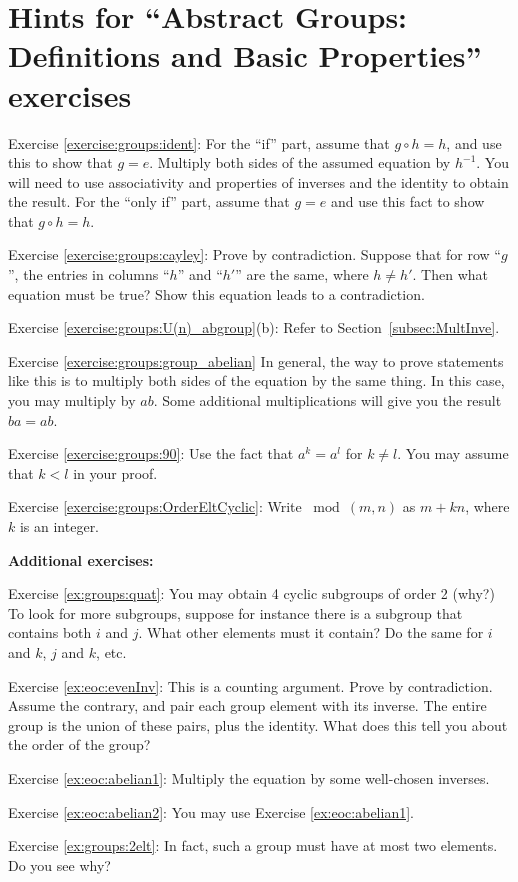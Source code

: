 \section{Hints for ``Abstract Groups: Definitions and Basic Properties'' exercises}
\label{sec:Groups:Hints}

\noindent Exercise \ref{exercise:groups:ident}: For the ``if'' part, assume that $g \circ h = h$, and use this to show that $g = e$. Multiply both sides of the assumed equation by $h^{-1}$. You will need to use associativity and properties of inverses and the identity to obtain the result.  For the ``only if'' part, assume that $g=e$ and use this fact to show that $g \circ h = h$.

\noindent Exercise \ref{exercise:groups:cayley}: Prove by contradiction. Suppose that for row ``$g$'', the entries in columns ``$h$'' and ``$h'$'' are the same, where $h \neq h'$.  Then what equation must be true? Show this equation leads to a contradiction.

\noindent Exercise \ref{exercise:groups:U(n)_abgroup}(b): Refer to Section~\ref{subsec:MultInve}.

\noindent Exercise \ref{exercise:groups:group_abelian} In general, the way to prove statements like this is to multiply both sides of the equation by the same thing.  In this case, you may multiply by $ab$.  Some additional multiplications will give you the result $ba=ab$.

\noindent Exercise \ref{exercise:groups:90}: Use the fact that $a^k = a^l$ for $k \neq l$.  You may assume that $k < l$ in your proof.

\noindent Exercise \ref{exercise:groups:OrderEltCyclic}: Write $\bmod(m,n)$ as $m + kn$, where $k$ is an integer.

\bigskip

\textbf{Additional exercises:}

\noindent Exercise \ref{ex:groups:quat}: You may obtain 4 cyclic subgroups of order 2 (why?)  To look for more subgroups, suppose for instance there is a subgroup that contains both $i$ and $j$.  What other elements must it contain?  Do the same for $i$ and $k$, $j$ and $k$, etc.

\noindent Exercise \ref{ex:eoc:evenInv}: This is a counting argument. Prove by contradiction. Assume the contrary, and pair each group element with its inverse. The entire group is the union of these pairs, plus the identity. What does this tell you about the order of the group?

\noindent Exercise \ref{ex:eoc:abelian1}: Multiply the equation by some well-chosen inverses.

\noindent Exercise \ref{ex:eoc:abelian2}: You may use Exercise \ref{ex:eoc:abelian1}.

\noindent Exercise \ref{ex:groups:2elt}: In fact, such a group must have at most two elements. Do you see why?

